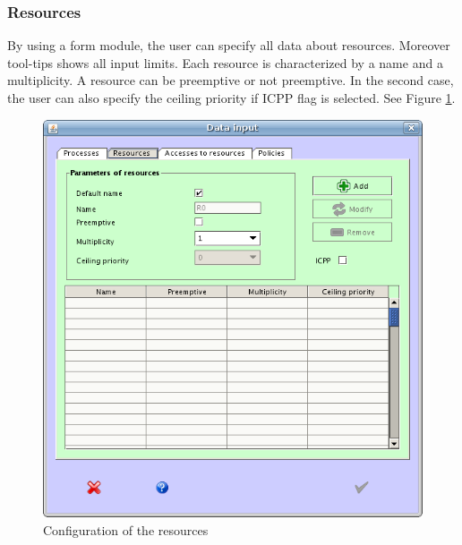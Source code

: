 \documentclass[10pt,a4paper,twoside,titlepage]{article}
\begin{document}
\subsubsection{Resources}
\label{subsubsec:resources}
By using a form module, the user can specify all data about resources. Moreover tool-tips shows all input limits. Each resource is characterized by a name and a multiplicity. A resource can be preemptive or not preemptive. In the second case, the user can also specify the ceiling priority if ICPP flag is selected. See Figure \ref{fig:config_resources}.
\begin{figure}[tb]
	\begin{center}
		\includegraphics[scale=0.6]{config_resources}
		\caption[Configuration of the resources]{Configuration of the resources}
		\label{fig:config_resources}
	\end{center}
\end{figure}
\end{document}
